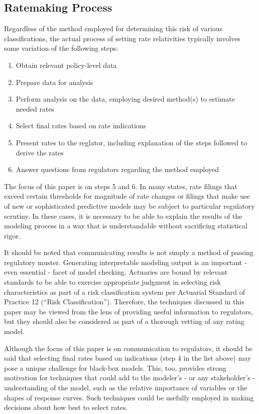 \documentclass[preprint, 3p, twocolumn, letterpaper, 10pt]{elsarticle} %
\providecommand{\tightlist}{%
  \setlength{\itemsep}{0pt}\setlength{\parskip}{0pt}}
\begin{document}
\hypertarget{ratemaking-process}{%
\subsection{Ratemaking Process}\label{ratemaking-process}}

Regardless of the method employed for determining this risk of various
classifications, the actual process of setting rate relativities typically
involves some variation of the following steps:

\begin{enumerate}
\def\labelenumi{\arabic{enumi}.}
\tightlist
\item
  Obtain relevant policy-level data
\item
  Prepare data for analysis
\item
  Perform analysis on the data, employing desired method(s) to estimate
  needed rates
\item
  Select final rates based on rate indications
\item
  Present rates to the reglator, including explanation of the steps followed to
  derive the rates
\item
  Answer questions from regulators regarding the method employed
\end{enumerate}

The focus of this paper is on steps 5 and 6.
In many states, rate filings that exceed certain thresholds for
magnitude of rate changes or filings that make use of new or sophisticated
predictive models may be subject to particular regulatory scrutiny. In these cases,
it is necessary to be able to explain the results of the modeling process in a
way that is understandable without sacrificing statistical rigor.

It should be noted that communicating results is not simply a method of passing
regulatory muster. Generating interpretable modeling output is an important -
even essential - facet of model checking. Actuaries are bound by relevant standards
to be able to exercise appropriate judgment in selecting risk characteristics as
part of a risk classification system per Actuarial Standard of Practice 12
(``Risk Classification''). Therefore, the techniques discussed
in this paper may be viewed from the lens of providing useful information to
regulators, but they should also be considered as part of a thorough vetting of
any rating model.

Although the focus of this paper is on communication to regulators, it should be
said that selecting final rates based on indications (step 4 in the list above) may
pose a unique challenge for black-box models. This, too, provides strong motivation
for techniques that could add to the modeler's - or any stakeholder's -
understanding of the model, such as the relative importance of variables or the
shapes of response curves. Such techniques could be usefully employed in making
decisions about how best to select rates.
\end{document}
